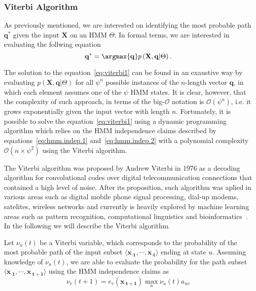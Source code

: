 \subsubsection{Viterbi Algorithm}
\label{sec:viterbi.algorithm}

As previously mentioned, we are interested on identifying the most probable path $ \mathbf{q^*} $ given the input $ \mathbf{X} $ on an HMM $ \Theta $. In formal terms, we are interested in evaluating the follwing equation
\begin{equation}
  \label{eq:viterbi1}
  \mathbf{q^*} = \argmax{\mathbf{q}} p\left(\mathbf{X}, \mathbf{q} | \Theta \right).
\end{equation}

The solution to the equation~\ref{eq:viterbi1} can be found in an exaustive way by evaluating $ p\left(\mathbf{X}, \mathbf{q} | \Theta \right) $ for all $ {\psi}^{n} $ possible instances of the $n$-length vector $ \mathbf{q} $, in which each element assumes one of the $\psi$ HMM states. It is clear, however, that the complexity of such approach, in terms of the big-$\mathcal{O}$ notation is $ \mathcal{O}({\psi}^{n}) $, i.e. it grows exponentially given the input vector with length $n$. Fortunately, it is possible to solve the equation~\ref{eq:viterbi1} using a dynamic programming algorithm which relies on the HMM independence claims described by equations~\ref{eq:hmm.indep.1} and~\ref{eq:hmm.indep.2} with a polynomial complexity $ \mathcal{O}(n \times {\psi}^2) $ using the Viterbi algorithm.

The Viterbi algorithm was proposed by Andrew Viterbi in 1976 as a decoding algorithm for convolutional codes over digital telecommunication connections that contained a high level of noise. After its proposition, such algorithm was aplied in various areas such as digital mobile phone signal processing, dial-up modems, satelites, wireless networks and currently is heavily explored by machine learning areas such as pattern recognition, computational linguistics and bioinformatics~\cite{rabiner1989}. In the following we will describe the Viterbi algorithm.

Let $ \nu_u(t) $ be a Viterbi variable, which corresponds to the probability of the most probable path of the input subset $ \langle \mathbf{{x}_{\cdot 1}}, \cdots, \mathbf{{x}_{\cdot t}} \rangle $ ending at state $ u $. Assuming knowledge of $ \nu_u(t) $, we are able to evaluate the probability for the path subset $ \langle \mathbf{{x}_{\cdot 1}}, \cdots, \mathbf{{x}_{\cdot t+1}} \rangle $ using the HMM independence claims as
\begin{equation}
  \label{eq:viterbi2}
  \nu_v(t+1) = e_v(\mathbf{{x}_{\cdot t+1}}) \max_{u} \nu_u(t) a_{uv}
\end{equation}

